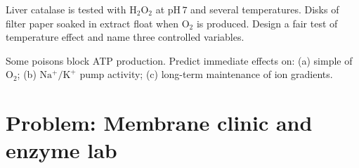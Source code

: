 \begin{exercise}[$\star\star\star$]\label{exo:g10:membranes-enzymes:10}
Liver catalase is tested with $\mathrm{H_2O_2}$ at $\mathrm{pH}\,7$ and
several temperatures. Disks of filter paper soaked in  extract
float when $\mathrm{O_2}$ is produced. Design a fair test of temperature
effect and name three controlled variables.
\end{exercise}

\begin{exercise}[$\star\star\star$]\label{exo:g10:membranes-enzymes:11}
Some poisons block ATP production. Predict immediate effects on: (a)
simple  of $\mathrm{O_2}$; (b) $\mathrm{Na^+/K^+}$ pump
activity; (c) long-term maintenance of ion gradients.
\end{exercise}

\section{Problem: Membrane clinic and enzyme lab}


